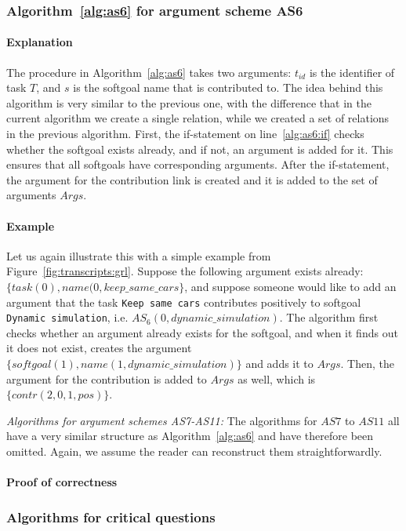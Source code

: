 \subsubsection{Algorithm~\ref{alg:as6} for argument scheme AS6} 

\paragraph{Explanation} The procedure in Algorithm~\ref{alg:as6} takes two arguments: $t_{id}$ is the identifier of task $T$, and $s$ is the softgoal name that is contributed to. The idea behind this algorithm is very similar to the previous one, with the difference that in the current algorithm we create a single relation, while we created a set of relations in the previous algorithm. First, the if-statement on line~\ref{alg:as6:if} checks whether the softgoal exists already, and if not, an argument is added for it. This ensures that all softgoals have corresponding arguments. After the if-statement, the argument for the contribution link is created and it is added to the set of arguments $Args$. 

\paragraph{Example} Let us again illustrate this with a simple example from Figure~\ref{fig:transcripts:grl}. Suppose the following argument exists already: $\{task(0),name(0,keep\_same\_cars\}$, and suppose someone would like to add an argument that the task \texttt{Keep same cars} contributes positively to softgoal \texttt{Dynamic simulation}, i.e. $AS_6(0,dynamic\_simulation)$. The algorithm first checks whether an argument already exists for the softgoal, and when it finds out it does not exist, creates the argument $\{softgoal(1),name(1,dynamic\_simulation)\}$ and adds it to $Args$. Then, the argument for the contribution is added to $Args$ as well, which is $\{contr(2,0,1,pos)\}$.

\emph{Algorithms for argument schemes AS7-AS11:} The algorithms for $AS7$ to $AS11$ all have a very similar structure as Algorithm~\ref{alg:as6} and have therefore been omitted. Again, we assume the reader can reconstruct them straightforwardly.

\paragraph{Proof of correctness} 

\subsubsection*{Algorithms for critical questions}

